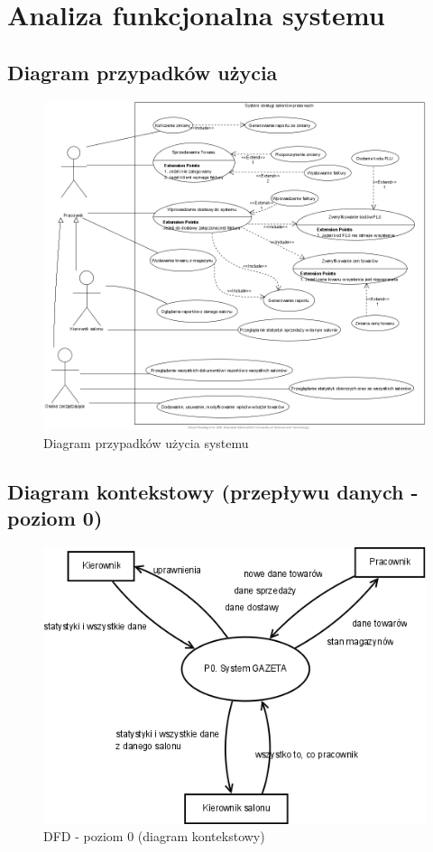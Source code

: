\section{Analiza funkcjonalna systemu}
\subsection{Diagram przypadków użycia}
\begin{figure}[h]
\includegraphics[width=1\textwidth]{gfx/usecase.png}
\caption{Diagram przypadków użycia systemu}
\end{figure}
\clearpage
\subsection{Diagram kontekstowy (przepływu danych - poziom 0)}
\begin{figure}[h]
\includegraphics[width=1\textwidth]{gfx/dfd-0.png}
\caption{DFD - poziom 0 (diagram kontekstowy)}
\end{figure}
\clearpage
